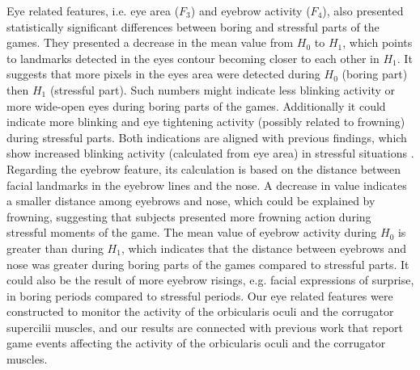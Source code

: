 Eye related features, i.e. eye area ($F_3$) and eyebrow activity ($F_4$), also presented statistically significant differences between boring and stressful parts of the games. They presented a decrease in the mean value from $H_0$ to $H_1$, which points to landmarks detected in the eyes contour becoming closer to each other in $H_1$. It suggests that more pixels in the eyes area were detected during $H_0$ (boring part) then $H_1$ (stressful part). Such numbers might indicate less blinking activity or more wide-open eyes during boring parts of the games. Additionally it could indicate more blinking and eye tightening activity (possibly related to frowning) during stressful parts. Both indications are aligned with previous findings, which show increased blinking activity (calculated from eye area) in stressful situations \cite{giannakakis2017stress}. Regarding the eyebrow feature, its calculation is based on the distance between facial landmarks in the eyebrow lines and the nose. A decrease in value indicates a smaller distance among eyebrows and nose, which could be explained by frowning, suggesting that subjects presented more frowning action during stressful moments of the game. The mean value of eyebrow activity during $H_0$ is greater than during $H_1$, which indicates that the distance between eyebrows and nose was greater during boring parts of the games compared to stressful parts. It could also be the result of more eyebrow risings, e.g. facial expressions of surprise, in boring periods compared to stressful periods. Our eye related features were constructed to monitor the activity of the orbicularis oculi and the corrugator supercilii muscles, and our results are connected with previous work that report game events affecting the activity of the orbicularis oculi \cite{ravaja20051} and the corrugator \cite{hazlett2006measuring} muscles.

